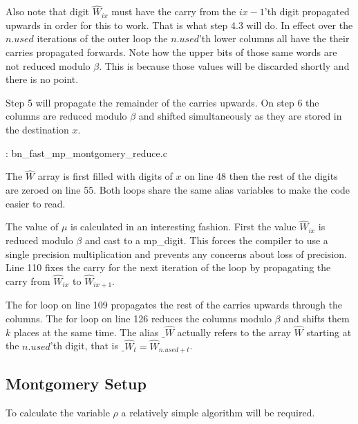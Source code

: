 \documentclass[b5paper]{book}
\begin{document}
Also note that digit $\hat W_{ix}$ must have the carry from the $ix - 1$'th digit propagated upwards in order for this to work.  That is what step
4.3 will do.  In effect over the $n.used$ iterations of the outer loop the $n.used$'th lower columns all have the their carries propagated forwards.  Note
how the upper bits of those same words are not reduced modulo $\beta$.  This is because those values will be discarded shortly and there is no
point.

Step 5 will propagate the remainder of the carries upwards.  On step 6 the columns are reduced modulo $\beta$ and shifted simultaneously as they are
stored in the destination $x$.  

\vspace{+3mm}\begin{small}
\hspace{-5.1mm}{\bf File}: bn\_fast\_mp\_montgomery\_reduce.c
\vspace{-3mm}
\begin{alltt}
\end{alltt}
\end{small}

The $\hat W$ array is first filled with digits of $x$ on line 48 then the rest of the digits are zeroed on line 55.  Both loops share
the same alias variables to make the code easier to read.  

The value of $\mu$ is calculated in an interesting fashion.  First the value $\hat W_{ix}$ is reduced modulo $\beta$ and cast to a mp\_digit.  This
forces the compiler to use a single precision multiplication and prevents any concerns about loss of precision.   Line 110 fixes the carry 
for the next iteration of the loop by propagating the carry from $\hat W_{ix}$ to $\hat W_{ix+1}$.

The for loop on line 109 propagates the rest of the carries upwards through the columns.  The for loop on line 126 reduces the columns
modulo $\beta$ and shifts them $k$ places at the same time.  The alias $\_ \hat W$ actually refers to the array $\hat W$ starting at the $n.used$'th
digit, that is $\_ \hat W_{t} = \hat W_{n.used + t}$.  

\subsection{Montgomery Setup}
To calculate the variable $\rho$ a relatively simple algorithm will be required.  
\end{document}
